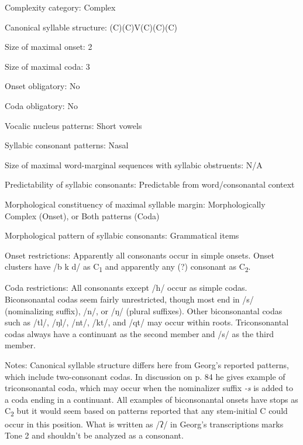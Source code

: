 {\begin{appendixdesc}
\item[Complexity category:] Complex

\item[Canonical syllable structure:] (C)(C)V(C)(C)(C) \citep[80--84]{Georg2007}

\item[Size of maximal onset:] 2

\item[Size of maximal coda:] 3

\item[Onset obligatory:] No

\item[Coda obligatory:] No

\item[Vocalic nucleus patterns:] Short vowels

\item[Syllabic consonant patterns:] Nasal

\item[Size of maximal word-marginal sequences with syllabic obstruents:] N/A

\item[Predictability of syllabic consonants:] Predictable from word/consonantal context

\item[Morphological constituency of maximal syllable margin:] Morphologically Complex (Onset), or Both patterns (Coda)

\item[Morphological pattern of syllabic consonants:] Grammatical items

\item[Onset restrictions:] Apparently all consonants occur in simple onsets. Onset clusters have /b k d/ as C\textsubscript{1} and apparently any (?) consonant as C\textsubscript{2}.

\item[Coda restrictions:] All consonants except /h/ occur as simple codas. Biconsonantal codas seem fairly unrestricted, though most end in /s/ (nominalizing suffix), /n/, or /ŋ/ (plural suffixes). Other biconsonantal codas such as /tl/, /ŋl/, /nt/, /kt/, and /qt/ may occur within roots. Triconsonantal codas always have a continuant as the second member and /s/ as the third member.

\item[Notes:] Canonical syllable structure differs here from Georg’s reported patterns, which include two-consonant codas. In discussion on p. 84 he gives example of triconsonantal coda, which may occur when the nominalizer suffix \textit{{}-s} is added to a coda ending in a continuant. All examples of biconsonantal onsets have stops as C\textsubscript{2} but it would seem based on patterns reported that any stem-initial C could occur in this position. What is written as /ʔ/ in Georg’s transcriptions marks Tone 2 and shouldn’t be analyzed as a consonant.
\end{appendixdesc}
}
